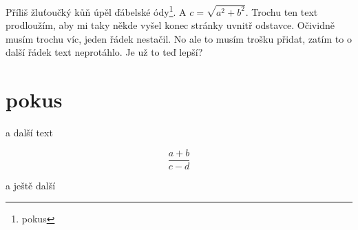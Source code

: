 \documentclass{article}
\begin{document}
Příliš žluťoučký kůň úpěl ďábelské ódy\footnote{pokus}. A $c=\sqrt{a^2+b^2}$. Trochu ten text prodloužím, aby mi taky někde vyšel konec stránky uvnitř odstavce. Očividně musím trochu víc, jeden řádek nestačil. No ale to musím trošku přidat, zatím to o další řádek text neprotáhlo. Je už to teď lepší? 

\section{pokus}

a další text

\[\frac{a+b}{c-d}\]

a ještě další
\blinddocument
\end{document}
